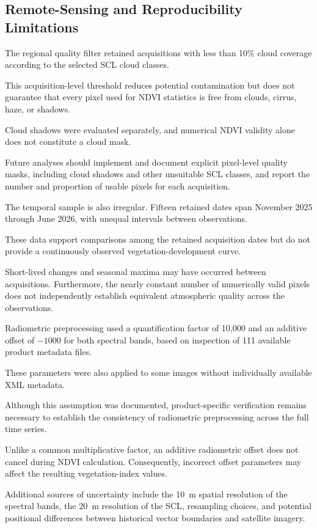 \subsection{Remote-Sensing and Reproducibility Limitations}

The regional quality filter retained
acquisitions with less than 10\% cloud
coverage according to the selected SCL
cloud classes.

This acquisition-level threshold reduces
potential contamination but does not
guarantee that every pixel used for NDVI
statistics is free from clouds, cirrus,
haze, or shadows.

Cloud shadows were evaluated separately,
and numerical NDVI validity alone does
not constitute a cloud mask.

Future analyses should implement and
document explicit pixel-level quality
masks, including cloud shadows and
other unsuitable SCL classes, and report
the number and proportion of usable
pixels for each acquisition.

The temporal sample is also irregular.
Fifteen retained dates span November
2025 through June 2026, with unequal
intervals between observations.

These data support comparisons among
the retained acquisition dates but do
not provide a continuously observed
vegetation-development curve.

Short-lived changes and seasonal
maxima may have occurred between
acquisitions. Furthermore, the nearly
constant number of numerically valid
pixels does not independently establish
equivalent atmospheric quality across
the observations.

Radiometric preprocessing used a
quantification factor of 10,000 and
an additive offset of $-1000$ for
both spectral bands, based on inspection
of 111 available product metadata files.

These parameters were also applied
to some images without individually
available XML metadata.

Although this assumption was documented,
product-specific verification remains
necessary to establish the consistency
of radiometric preprocessing across
the full time series.

Unlike a common multiplicative factor,
an additive radiometric offset does
not cancel during NDVI calculation.
Consequently, incorrect offset
parameters may affect the resulting
vegetation-index values.

Additional sources of uncertainty
include the 10~m spatial resolution
of the spectral bands, the 20~m
resolution of the SCL, resampling
choices, and potential positional
differences between historical
vector boundaries and satellite
imagery.

